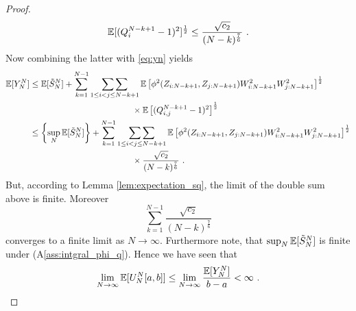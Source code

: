 \begin{thm}
\begin{proof}
		\begin{equation*}
		\mathbb{E}[(Q_i^{N-k+1} - 1)^2]^\frac{1}{2} \leq \frac{\sqrt{c_2}}{(N-k)^\frac{7}{6}}\textrm{ .}
		\end{equation*}
		Now combining the latter with \eqref{eq:yn} yields 
		\begin{align*}
		\mathbb{E}[Y_N^N] &\leq  \mathbb{E}[\tilde{S}_{N}^N] + \sum_{k=1}^{N-1} \mathop{\sum\sum}\limits_{1\leq i<j\leq N-k+1}\mathbb{E}\left[\phi^2(Z_{i:N-k+1}, Z_{j:N-k+1}) W^2_{i:N-k+1} W^2_{j:N-k+1}\right]^{\frac{1}{2}}\\
		&\qquad\qquad\qquad\qquad\qquad\qquad \times \mathbb{E}\left[(Q_{i,j}^{N-k+1} - 1)^2\right]^{\frac{1}{2}}\\
		&\leq \left\{\sup_{N}\mathbb{E}[\tilde{S}_{N}^N]\right\} + \sum_{k=1}^{N-1} \mathop{\sum\sum}\limits_{1\leq i<j\leq N-k+1}\mathbb{E}\left[\phi^2(Z_{i:N-k+1}, Z_{j:N-k+1}) W^2_{i:N-k+1} W^2_{j:N-k+1}\right]^{\frac{1}{2}}\\
		&\qquad\qquad\qquad\qquad\qquad\qquad \times \frac{\sqrt{c_2}}{(N-k)^\frac{7}{6}}\textrm{ .}
		\end{align*}
		But, according to Lemma \ref{lem:expectation_sq}, the limit of the double sum above is finite. Moreover 
		$$ \sum_{k=1}^{N-1}\frac{\sqrt{c_2}}{(N-k)^\frac{7}{6}}$$
		converges to a finite limit as $N\to\infty$. Furthermore note, that $\sup_{N}\mathbb{E}[\tilde{S}_{N}^N]$ is finite under (A\ref{ass:intgral_phi_q}). Hence we have seen that
		$$\lim\limits_{N\to\infty}\mathbb{E}[U_{N}^N[a,b]]\leq \lim\limits_{N\to\infty}\frac{\mathbb{E}[Y_{N}^N]}{b-a} <\infty\textrm{ .}$$
	\end{proof}
\end{thm}

